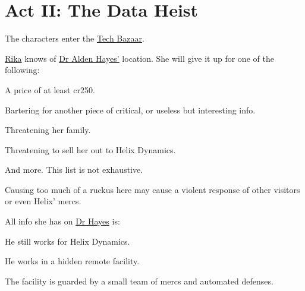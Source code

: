 \chapter{Act II: The Data Heist} %
\label{ch:act2}
The characters enter the \hyperref[location:techbazaar]{Tech Bazaar}.
\par
\hyperref[char:rika]{Rika} knows of \hyperref[char:hayes]{Dr Alden Hayes'} location.
She will give it up for one of the following:
\begin{sitemize}
	\item A price of at least cr250.
	\item Bartering for another piece of critical, or useless but interesting info.
	\item Threatening her family.
	\item Threatening to sell her out to Helix Dynamics.
	\item And more.
		This list is not exhaustive.
\end{sitemize}

Causing too much of a ruckus here
	may cause a violent response of other visitors
	or even Helix' mercs.

All info she has on \hyperref[char:hayes]{Dr Hayes} is:
\begin{sitemize}
	\item He still works for Helix Dynamics.
	\item He works in a hidden remote facility.
	\item The facility is guarded by a small team of mercs and automated defenses.
\end{sitemize}
